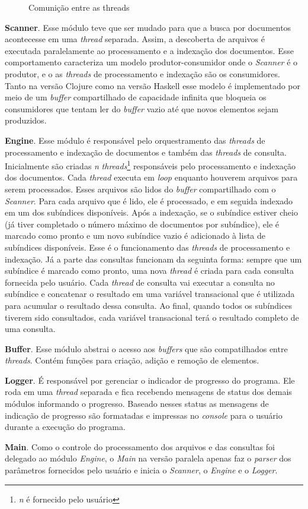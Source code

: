 \begin{figure}[h]
 \centering
 \def\svgwidth{0.6\columnwidth}
 
 \caption{Comunição entre as threads}
\end{figure}

\textbf{Scanner}. Esse módulo teve que ser mudado para que a busca por documentos acontecesse em uma \emph{thread} separada. Assim, a descoberta de arquivos é executada paralelamente ao processamento e a indexação dos documentos. Esse comportamento caracteriza um modelo produtor-consumidor onde o \emph{Scanner} é o produtor, e o as \emph{threads} de processamento e indexação são os consumidores. Tanto na versão Clojure como na versão Haskell esse modelo é implementado por meio de um \emph{buffer} compartilhado de capacidade infinita que bloqueia os consumidores que tentam ler do \emph{buffer} vazio até que novos elementos sejam produzidos.

\textbf{Engine}. Esse módulo é responsável pelo orquestramento das \emph{threads} de processamento e indexação de documentos e também das \emph{threads} de consulta. Inicialmente são criadas \emph{n} \emph{threads}\footnote{\emph{n} é fornecido pelo usuário} responsáveis pelo processamento e indexação dos documentos. Cada \emph{thread} executa em \emph{loop} enquanto houverem arquivos para serem processados. Esses arquivos são lidos do \emph{buffer} compartilhado com o \emph{Scanner}. Para cada arquivo que é lido, ele é processado, e em seguida indexado em um dos subíndices disponíveis. Após a indexação, se o subíndice estiver cheio (já tiver completado o número máximo de documentos por subíndice), ele é marcado como pronto e um novo subíndice vazio é adicionado à lista de subíndices disponíveis. Esse é o funcionamento das \emph{threads} de processamento e indexação. Já a parte das consultas funcionam da seguinta forma: sempre que um subíndice é marcado como pronto, uma nova \emph{thread} é criada para cada consulta fornecida pelo usuário. Cada \emph{thread} de consulta vai executar a consulta no subíndice e concatenar o resultado em uma variável transacional que é utilizada para acumular o resultado dessa consulta. Ao final, quando todos os subíndices tiverem sido consultados, cada variável transacional terá o resultado completo de uma consulta.

\textbf{Buffer}. Esse módulo abstrai o acesso aos \emph{buffers} que são compatilhados entre \emph{threads}. Contém funções para criação, adição e remoção de elementos.

\textbf{Logger}. É responsável por gerenciar o indicador de progresso do programa. Ele roda em uma \emph{thread} separada e fica recebendo mensagens de status dos demais módulos informando o progresso. Baseado nesses status as mensagens de indicação de progresso são formatadas e impressas no \emph{console} para o usuário durante a execução do programa.

\textbf{Main}. Como o controle do processamento dos arquivos e das consultas foi delegado ao módulo \emph{Engine}, o \emph{Main} na versão paralela apenas faz o \emph{parser} dos parâmetros fornecidos pelo usuário e inicia o \emph{Scanner}, o \emph{Engine} e o \emph{Logger}.


